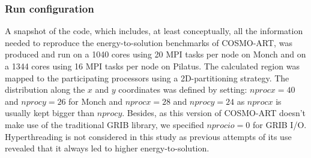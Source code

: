 \subsubsection{Run configuration}
A snapshot of the code, which includes, at least conceptually, all the
information needed  to reproduce the  energy-to-solution benchmarks of
COSMO-ART, was produced and run on a 1040 cores using 20 MPI tasks per
node on  Monch and  on a  1344 cores using  16 MPI  tasks per  node on
Pilatus.   The  calculated  region  was mapped  to  the  participating
processors using  a 2D-partitioning strategy.   The distribution along
the $x$  and $y$ coordinates  was defined by setting:  $nprocx=40$ and
$nprocy=26$ for  Monch and $nprocx=28$ and $nprocy=24$  as $nprocx$ is
usually  kept  bigger than  $nprocy$.   Besides,  as  this version  of
COSMO-ART  doesn't  make  use  of  the traditional  GRIB  library,  we
specified $nprocio=0$ for GRIB  I/O.  Hyperthreading is not considered
in this study as previous attempts  of its use revealed that it always
led to higher energy-to-solution.\\



